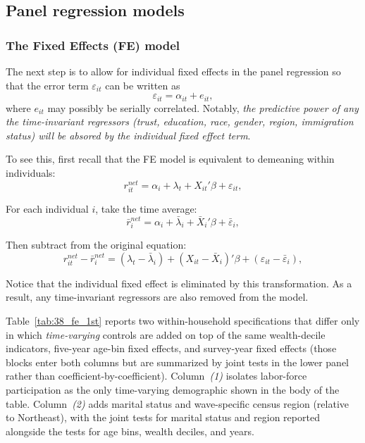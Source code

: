\subsection{Panel regression models}

\subsubsection{The Fixed Effects (FE) model}

\par The next step is to allow for individual fixed effects in the panel regression so that the error term $\varepsilon_{it}$ can be written as \[\varepsilon_{it} = \alpha_{it} + e_{it},\] where $e_{it}$ may possibly be serially correlated. Notably, \textit{the predictive power of any the time-invariant regressors (trust, education, race, gender, region, immigration status) will be absored by the individual fixed effect term}. 

\par To see this, first recall that the FE model is equivalent to demeaning within individuals:
\[
r^{net}_{it} = \alpha_i + \lambda_t + X_{it}'\beta + \varepsilon_{it},
\]

\par For each individual $i$, take the time average:
\[
\bar{r}^{net}_i = \alpha_i + \bar{\lambda}_i + \bar{X}_i'\beta + \bar{\varepsilon}_i,
\]

\par Then subtract from the original equation:
\[
r^{net}_{it} - \bar{r}^{net}_i
=
\left(\lambda_t - \bar{\lambda}_i\right)
+ \left(X_{it} - \bar{X}_i\right)'\beta
+ \left(\varepsilon_{it} - \bar{\varepsilon}_i\right),
\]

\par Notice that the individual fixed effect is eliminated by this transformation. As a result, any time-invariant regressors are also removed from the model.

\par Table~\ref{tab:38_fe_1st} reports two within-household specifications that differ only in which \emph{time-varying} controls are added on top of the same wealth-decile indicators, five-year age-bin fixed effects, and survey-year fixed effects (those blocks enter both columns but are summarized by joint tests in the lower panel rather than coefficient-by-coefficient). Column~\textit{(1)} isolates labor-force participation as the only time-varying demographic shown in the body of the table. Column~\textit{(2)} adds marital status and wave-specific census region (relative to Northeast), with the joint tests for marital status and region reported alongside the tests for age bins, wealth deciles, and years.

